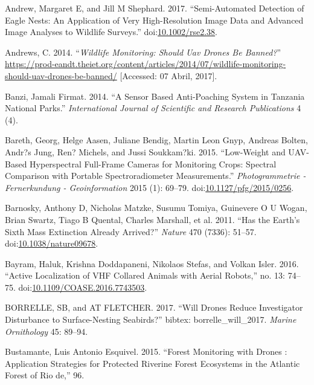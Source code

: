 \documentclass[]{interact}
\theoremstyle{plain}%
\theoremstyle{definition}
\theoremstyle{remark}
\begin{document}
\hypertarget{ref-andrew_semi-automated_2017}{}
Andrew, Margaret E, and Jill M Shephard. 2017. ``Semi-Automated
Detection of Eagle Nests: An Application of Very High-Resolution Image
Data and Advanced Image Analyses to Wildlife Surveys.''
doi:\href{https://doi.org/10.1002/rse2.38}{10.1002/rse2.38}.

\hypertarget{ref-Andrews2014}{}
Andrews, C. 2014. ``\emph{Wildlife Monitoring: Should Uav Drones Be
Banned?}''
\url{https://prod-eandt.theiet.org/content/articles/2014/07/wildlife-monitoring-should-uav-drones-be-banned/}
{[}Accessed: 07 Abril, 2017{]}.

\hypertarget{ref-banzi_sensor_2014}{}
Banzi, Jamali Firmat. 2014. ``A Sensor Based Anti-Poaching System in
Tanzania National Parks.'' \emph{International Journal of Scientific and
Research Publications} 4 (4).

\hypertarget{ref-bareth_low-weight_2015}{}
Bareth, Georg, Helge Aasen, Juliane Bendig, Martin Leon Gnyp, Andreas
Bolten, Andr?s Jung, Ren? Michels, and Jussi Soukkam?ki. 2015.
``Low-Weight and UAV-Based Hyperspectral Full-Frame Cameras for
Monitoring Crops: Spectral Comparison with Portable Spectroradiometer
Measurements.'' \emph{Photogrammetrie - Fernerkundung - Geoinformation}
2015 (1): 69--79.
doi:\href{https://doi.org/10.1127/pfg/2015/0256}{10.1127/pfg/2015/0256}.

\hypertarget{ref-barnosky_has_2011}{}
Barnosky, Anthony D, Nicholas Matzke, Susumu Tomiya, Guinevere O U
Wogan, Brian Swartz, Tiago B Quental, Charles Marshall, et al. 2011.
``Has the Earth's Sixth Mass Extinction Already Arrived?'' \emph{Nature}
470 (7336): 51--57.
doi:\href{https://doi.org/10.1038/nature09678}{10.1038/nature09678}.

\hypertarget{ref-bayram_active_2016}{}
Bayram, Haluk, Krishna Doddapaneni, Nikolaos Stefas, and Volkan Isler.
2016. ``Active Localization of VHF Collared Animals with Aerial
Robots,'' no. 13: 74--75.
doi:\href{https://doi.org/10.1109/COASE.2016.7743503}{10.1109/COASE.2016.7743503}.

\hypertarget{ref-borrelle_will_2017}{}
BORRELLE, SB, and AT FLETCHER. 2017. ``Will Drones Reduce Investigator
Disturbance to Surface-Nesting Seabirds?'' bibtex: borrelle\_will\_2017.
\emph{Marine Ornithology} 45: 89--94.

\hypertarget{ref-bustamante_forest_2015}{}
Bustamante, Luis Antonio Esquivel. 2015. ``Forest Monitoring with Drones
: Application Strategies for Protected Riverine Forest Ecosystems in the
Atlantic Forest of Rio de,'' 96.
\end{document}
